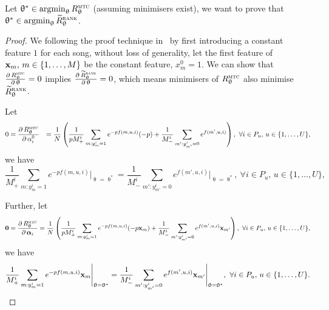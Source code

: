 Let $\uptheta^* \in \operatorname*{argmin}_{\uptheta} R_{\uptheta}^{\textsc{mtc}}$ (assuming minimisers exist),
we want to prove that $\uptheta^* \in \operatorname*{argmin}_{\uptheta} \widetilde R_{\uptheta}^{\textsc{rank}}$.

\begin{proof}
We following the proof technique in~\cite{ertekin2011equivalence}
by first introducing a constant feature $1$ for each song,
without loss of generality, let the first feature of $\mathbf{x}_m, \, m \in \{1,\dots,M\}$ be the constant feature, \ie $x_m^0 = 1$.
We can show that
$\frac{\partial \, R_{\uptheta}^{\textsc{mtc}}} {\partial \, \uptheta} = 0$ implies
$\frac{\partial \, \widetilde R_{\uptheta}^{\textsc{rank}}} {\partial \, \uptheta} = 0$,
which means minimisers of $R_{\uptheta}^{\textsc{mtc}}$ also minimise $\widetilde R_{\uptheta}^{\textsc{rank}}$.

Let 
\begin{equation*}
\begin{aligned}
0 
&= \frac{\partial \, R_{\uptheta}^{\textsc{mtc}}} {\partial \, \alpha_i^0}
&= \frac{1}{N} \left( 
   \frac{1}{p M_+^i} \sum_{m: y_m^i = 1} e^{-p f(m, u, i)} (-p)
   + \frac{1}{M_-^i} \sum_{m': y_{m'}^i = 0} e^{f(m', u, i)} \right),
\ \forall i \in P_u, \, u \in \{1,\dots,U\},
\end{aligned}
\end{equation*}
we have
\begin{equation}
\label{eq:eq1}
\frac{1}{M_+^i} \sum_{m: y_m^i = 1} e^{-p f(m, u, i)} \Bigg|_{\uptheta = \uptheta^*}
= \frac{1}{M_-^i} \sum_{m': y_{m'}^i = 0} e^{f(m', u, i)} \Bigg|_{\uptheta = \uptheta^*}, 
\ \forall i \in P_u, \, u \in \{1,\dots,U\},
\end{equation}

Further, let
\begin{equation*}
\mathbf{0} 
= \frac{\partial \, R_{\uptheta}^{\textsc{mtc}}} {\partial \, {\bm{\alpha}}_i} 
= \frac{1}{N} \left( 
   \frac{1}{p M_+^i} \sum_{m: y_m^i = 1} e^{-p f(m, u, i)} (-p \mathbf{x}_m)
   + \frac{1}{M_-^i} \sum_{m': y_{m'}^i = 0} e^{f(m', u, i)} \mathbf{x}_{m'} \right),
\ \forall i \in P_u, \, u \in \{1,\dots,U\},
\end{equation*}
we have
\begin{equation}
\label{eq:eq2}
\frac{1}{M_+^i} \sum_{m: y_m^i = 1} e^{-p f(m, u, i)} \mathbf{x}_m \Bigg|_{\uptheta = \uptheta^*}
= \frac{1}{M_-^i} \sum_{m': y_{m'}^i = 0} e^{f(m', u, i)} \mathbf{x}_{m'} \Bigg|_{\uptheta = \uptheta^*},
\ \forall i \in P_u, \, u \in \{1,\dots,U\}.
\end{equation}


\end{proof}
